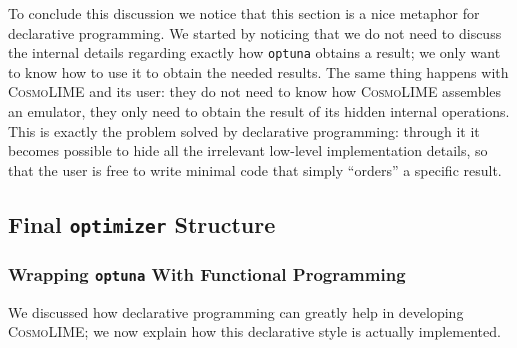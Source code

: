 To conclude this discussion we notice that this section is a nice metaphor for declarative programming. We started by noticing that we do not need to discuss the internal details regarding exactly how \texttt{optuna} obtains a result; we only want to know how to use it to obtain the needed results.
The same thing happens with \textsc{CosmoLIME} and its user: they do not need to know how \textsc{CosmoLIME} assembles an emulator, they only need to obtain the result of its hidden internal operations. This is exactly the problem solved by declarative programming: through it it becomes possible to hide all the irrelevant low-level implementation details, so that the user is free to write minimal code that simply ``orders'' a specific result.



\subsection{Final \texttt{optimizer} Structure}
\subsubsection{Wrapping \texttt{optuna} With Functional Programming}
We discussed how declarative programming can greatly help in developing \textsc{CosmoLIME}; we now explain how this declarative style is actually implemented.

